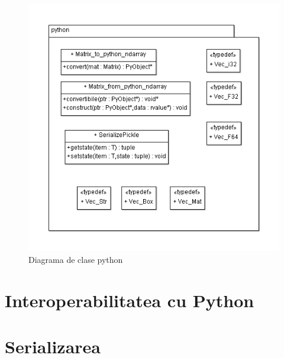 \begin{figure}[H]
	\centering
		\includegraphics[width=1.00\textwidth]{uml/PythonClassDiagram.png}
	\caption{Diagrama de clase python}
	\label{fig:PythonClassDiagram}
\end{figure}




\pagebreak

\section{Interoperabilitatea cu Python}
\pagebreak

\section{Serializarea}
\pagebreak